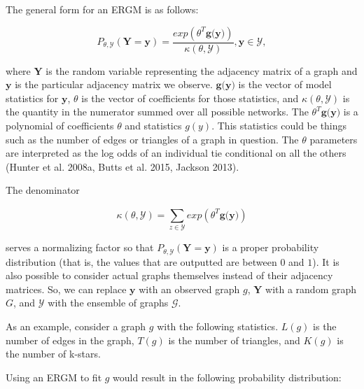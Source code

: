 \documentclass[12pt,twoside]{amherstthesis}
\begin{document}
  The general form for an ERGM is as follows:
  
  \[P_{\theta, \mathcal{Y}}(\textbf{Y} = \textbf{y}) = \frac {exp(\theta^{T}\textbf{g(y)})} {\kappa(\theta, \mathcal{Y})},\textbf{y} \in \mathcal{Y}, \]
  
  where \(\textbf{Y}\) is the random variable representing the adjacency
  matrix of a graph and \(\textbf{y}\) is the particular adjacency matrix
  we observe. \(\textbf{g(y)}\) is the vector of model statistics for
  \(\textbf{y}\), \(\theta\) is the vector of coefficients for those
  statistics, and \(\kappa(\theta, \mathcal{Y})\) is the quantity in the
  numerator summed over all possible networks. The
  \(\theta^{T}\textbf{g(y)}\) is a polynomial of coefficients \(\theta\)
  and statistics \(g(y)\). This statistics could be things such as the
  number of edges or triangles of a graph in question. The \(\theta\)
  parameters are interpreted as the log odds of an individual tie
  conditional on all the others (Hunter et al. 2008a, Butts et al. 2015,
  Jackson 2013).
  
  The denominator
  
  \[\kappa(\theta, \mathcal{Y}) = \sum_{z \in \mathcal{Y}}^{} exp(\theta^{T}\textbf{g(y)})\]
  
  serves a normalizing factor so that
  \(P_{\theta, \mathcal{Y}}(\textbf{Y} = \textbf{y})\) is a proper
  probability distribution (that is, the values that are outputted are
  between \(0\) and \(1\)). It is also possible to consider actual graphs
  themselves instead of their adjacency matrices. So, we can replace
  \(\textbf{y}\) with an observed graph \(g\), \(\textbf{Y}\) with a
  random graph \(G\), and \(\mathcal{Y}\) with the ensemble of graphs
  \(\mathcal{G}\).
  
  As an example, consider a graph \(g\) with the following statistics.
  \(L(g)\) is the number of edges in the graph, \(T(g)\) is the number of
  triangles, and \(K(g)\) is the number of k-stars.
  
  Using an ERGM to fit \(g\) would result in the following probability
  distribution:
  
\end{document}
